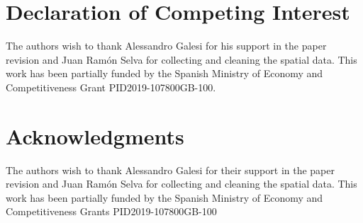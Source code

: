 \documentclass[Royal,times,sageh]{sagej}
\begin{document}
\hypertarget{declaration-of-competing-interest}{%
\section{Declaration of Competing
Interest}\label{declaration-of-competing-interest}}

The authors wish to thank Alessandro Galesi for his support in the paper
revision and Juan Ramón Selva for collecting and cleaning the spatial
data. This work has been partially funded by the Spanish Ministry of
Economy and Competitiveness Grant PID2019-107800GB-100.

\hypertarget{acknowledgments}{%
\section{Acknowledgments}\label{acknowledgments}}

The authors wish to thank Alessandro Galesi for their support in the
paper revision and Juan Ramón Selva for collecting and cleaning the
spatial data. This work has been partially funded by the Spanish
Ministry of Economy and Competitiveness Grants PID2019-107800GB-100



\end{document}
